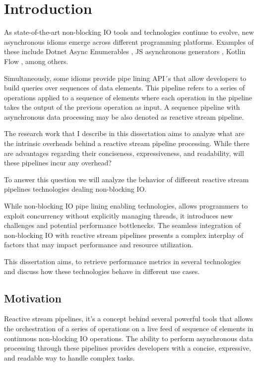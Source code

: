 % 
%  
%
\chapter{Introduction}
\label{cha:introduction}


As state-of-the-art non-blocking IO tools and technologies continue to evolve, new asynchronous idioms emerge across different programming platforms. Examples of these include Dotnet Async Enumerables \cite{DOTNET_ASYNC_ENUM}, JS asynchronous generators \cite{JS_ASYNC_GENERATOR}, Kotlin Flow \cite{KOTLIN_FLOW}, among others.

Simultaneously, some idioms provide pipe lining API´s \cite{FOWLER} that allow developers to build queries over sequences of data elements. This pipeline refers to a series of operations applied to a sequence of elements where each operation in the pipeline takes the output of the previous operation as input. A sequence pipeline with asynchronous data processing may be also denoted as reactive stream pipeline.

The research work that I describe in this dissertation aims to analyze what are the intrinsic overheads behind a reactive stream pipeline processing. While there are advantages regarding their conciseness, expressiveness, and readability, will these pipelines incur any overhead?

To answer this question we will analyze the behavior of different reactive stream pipelines technologies dealing non-blocking IO.

While non-blocking IO pipe lining enabling technologies, allows programmers to exploit concurrency without explicitly managing threads, it introduces new challenges and potential performance bottlenecks. The seamless integration of non-blocking IO with reactive stream pipelines presents a complex interplay of factors that may impact performance and resource utilization. 

This dissertation aims, to retrieve performance metrics in several technologies and discuss how these technologies behave in different use cases.

\section{Motivation}
\label{sec:motivation}

Reactive stream pipelines, it's a  concept behind several powerful tools that allows the orchestration of a series of operations on a live feed of sequence of elements in continuous non-blocking IO operations. The ability to perform asynchronous data processing through these pipelines provides developers with a concise, expressive, and readable way to handle complex tasks.

